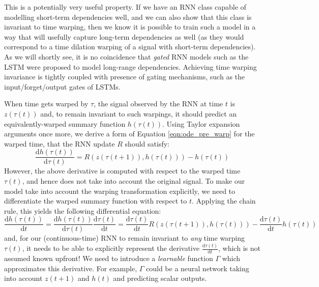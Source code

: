 This is a potentially very useful property. If we have an RNN class capable of modelling short-term dependencies well, and we can also show that this class is invariant to time warping, then we know it is possible to train such a model in a way that will usefully capture long-term dependencies as well (as they would correspond to a time dilation warping of a signal with short-term dependencies). 
%
As we will shortly see, it is no coincidence that \emph{gated} RNN models such as the LSTM were proposed to model long-range dependencies. Achieving time warping invariance is tightly coupled with presence of gating mechanisms, such as the input/forget/output gates of LSTMs.

When time gets warped by $\tau$, the signal observed by the RNN at time $t$ is $z(\tau(t))$ and, to remain invariant to such warpings, it should predict an equivalently-warped summary function $h(\tau(t))$. Using Taylor expansion arguments once more, we derive a form of Equation \ref{eqn:ode_pre_warp} for the warped time, that the RNN update $R$ should satisfy:
\begin{equation}\label{eqn:ode_post_warp}
    \frac{\mathrm{d}h(\tau(t))}{\mathrm{d}\tau(t)} = R(z(\tau(t+1)), h(\tau(t))) - h(\tau(t))
\end{equation}
However, the above derivative is computed with respect to the warped time $\tau(t)$, and hence does not take into account the original signal. To make our model take into account the warping transformation explicitly, we need to differentiate the warped summary function with respect to $t$. Applying the chain rule, this yields the following differential equation:
\begin{equation}\label{eqn:full_ode_warp}
    \frac{\mathrm{d}h(\tau(t))}{\mathrm{d}t} = \frac{\mathrm{d}h(\tau(t))}{\mathrm{d}\tau(t)}\frac{\mathrm{d}\tau(t)}{\mathrm{d}t} = \frac{\mathrm{d}\tau(t)}{\mathrm{d}t}R(z(\tau(t+1)), h(\tau(t))) - \frac{\mathrm{d}\tau(t)}{\mathrm{d}t}h(\tau(t))
\end{equation}
and, for our (continuous-time) RNN to remain invariant to \emph{any} time warping $\tau(t)$, it needs to be able to explicitly represent the derivative $\frac{\mathrm{d}\tau(t)}{\mathrm{d}t}$, which is not assumed known upfront! We need to introduce a \emph{learnable} function $\Gamma$ which approximates this derivative. For example, $\Gamma$ could be a neural network taking into account $z(t+1)$ and $h(t)$ and predicting scalar outputs.

